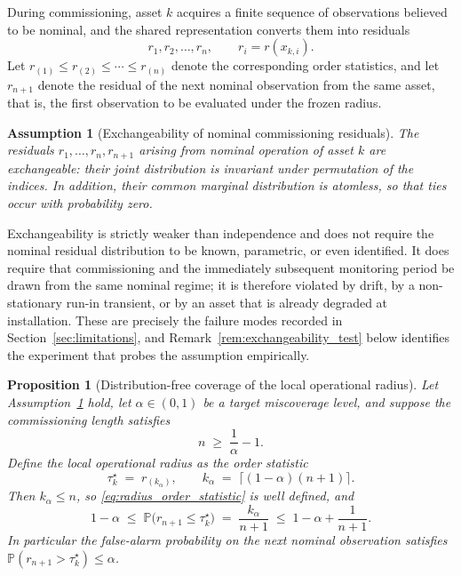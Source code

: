 \documentclass[a4paper]{cas-sc}
\newtheorem{proposition}{Proposition}
\newtheorem{assumption}{Assumption}
\newcommand{\residual}{\ensuremath{r}}
\newcommand{\Prob}{\ensuremath{\mathbb{P}}}
\begin{document}
During commissioning, asset \(k\) acquires a finite sequence of
observations believed to be nominal, and the shared representation converts
them into residuals
\begin{equation}
\residual_1,\residual_2,\ldots,\residual_n,
\qquad \residual_i = \residual(x_{k,i}).
\label{eq:commissioning_sample}
\end{equation}
Let \(\residual_{(1)}\le\residual_{(2)}\le\cdots\le\residual_{(n)}\) denote
the corresponding order statistics, and let \(\residual_{n+1}\) denote the
residual of the next nominal observation from the same asset, that is, the
first observation to be evaluated under the frozen radius.

\begin{assumption}[Exchangeability of nominal commissioning residuals]
\label{ass:exchangeability}
The residuals \(\residual_1,\ldots,\residual_n,\residual_{n+1}\) arising
from nominal operation of asset \(k\) are exchangeable: their joint
distribution is invariant under permutation of the indices. In addition,
their common marginal distribution is atomless, so that ties occur with
probability zero.
\end{assumption}

Exchangeability is strictly weaker than independence and does not require
the nominal residual distribution to be known, parametric, or even
identified. It does require that commissioning and the immediately
subsequent monitoring period be drawn from the same nominal regime; it is
therefore violated by drift, by a non-stationary run-in transient, or by an
asset that is already degraded at installation. These are precisely the
failure modes recorded in Section~\ref{sec:limitations}, and
Remark~\ref{rem:exchangeability_test} below identifies the experiment that
probes the assumption empirically.

\begin{proposition}[Distribution-free coverage of the local operational radius]
\label{prop:coverage}
Let Assumption~\ref{ass:exchangeability} hold, let
\(\alpha\in(0,1)\) be a target miscoverage level, and suppose the
commissioning length satisfies
\begin{equation}
n \;\ge\; \frac{1}{\alpha}-1 .
\label{eq:feasibility}
\end{equation}
Define the local operational radius as the order statistic
\begin{equation}
\tau_k^\star \;=\; \residual_{(k_\alpha)},
\qquad
k_\alpha \;=\; \bigl\lceil (1-\alpha)(n+1) \bigr\rceil .
\label{eq:radius_order_statistic}
\end{equation}
Then \(k_\alpha \le n\), so \eqref{eq:radius_order_statistic} is
well defined, and
\begin{equation}
1-\alpha
\;\le\;
\Prob\bigl(\residual_{n+1} \le \tau_k^\star\bigr)
\;=\;
\frac{k_\alpha}{n+1}
\;\le\;
1-\alpha+\frac{1}{n+1}.
\label{eq:coverage}
\end{equation}
In particular the false-alarm probability on the next nominal observation
satisfies
\(\Prob(\residual_{n+1} > \tau_k^\star) \le \alpha\).
\end{proposition}
\end{document}
